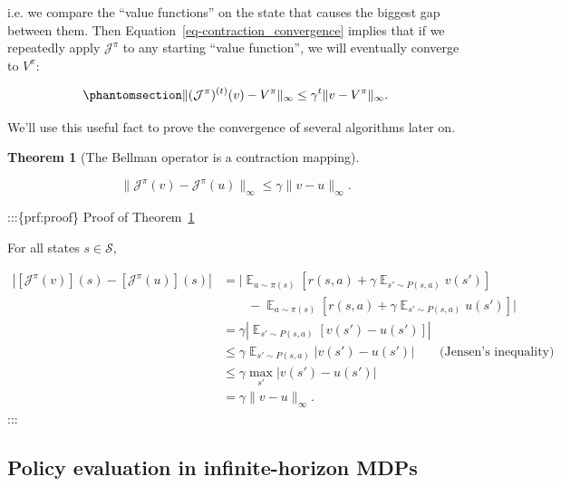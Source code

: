 \documentclass[
  letterpaper,
  DIV=11,
  numbers=noendperiod]{scrreprt}
\theoremstyle{plain}
\theoremstyle{plain}
\newtheorem{theorem}{Theorem}[chapter]
\theoremstyle{definition}
\theoremstyle{definition}
\theoremstyle{remark}
\begin{document}
i.e. we compare the ``value functions'' on the state that causes the
biggest gap between them. Then Equation~\ref{eq-contraction_convergence}
implies that if we repeatedly apply \(\mathcal{J}^\pi\) to any starting
``value function'', we will eventually converge to \(V^\pi\):

\begin{equation}\phantomsection\label{eq-bellman_convergence}{
\|(\mathcal{J}^\pi)^{(t)}(v) - V^\pi \|_{\infty} \le \gamma^{t} \| v - V^\pi\|_{\infty}.
}\end{equation}

We'll use this useful fact to prove the convergence of several
algorithms later on.

\begin{theorem}[The Bellman operator is a contraction
mapping]\protect\hypertarget{thm-bellman_contraction}{}\label{thm-bellman_contraction}

\[
\|\mathcal{J}^{\pi} (v) - \mathcal{J}^{\pi} (u) \|_{\infty} \le \gamma \|v - u \|_{\infty}.
\]

\end{theorem}

:::\{prf:proof\} Proof of Theorem~\ref{thm-bellman_contraction}

For all states \(s \in \mathcal{S}\),

\[
\begin{aligned}
|[\mathcal{J}^{\pi} (v)](s) - [\mathcal{J}^{\pi} (u)](s)|&= \Big| \mathop{\mathbb{E}}_{a \sim \pi(s)} \left[ r(s, a) + \gamma \mathop{\mathbb{E}}_{s' \sim P(s, a)} v(s') \right] \\
&\qquad - \mathop{\mathbb{E}}_{a \sim \pi(s)} \left[r(s, a) + \gamma \mathop{\mathbb{E}}_{s' \sim P(s, a)} u(s') \right] \Big| \\
&= \gamma \left|\mathop{\mathbb{E}}_{s' \sim P(s, a)} [v(s') - u(s')] \right| \\
&\le \gamma \mathop{\mathbb{E}}_{s' \sim P(s, a)}|v(s') - u(s')| \qquad \text{(Jensen's inequality)} \\
&\le \gamma \max_{s'} |v(s') - u(s')| \\
&= \gamma \|v - u \|_{\infty}.
\end{aligned}
\] :::

\subsection{Policy evaluation in infinite-horizon
MDPs}\label{policy-evaluation-in-infinite-horizon-mdps}
\end{document}
